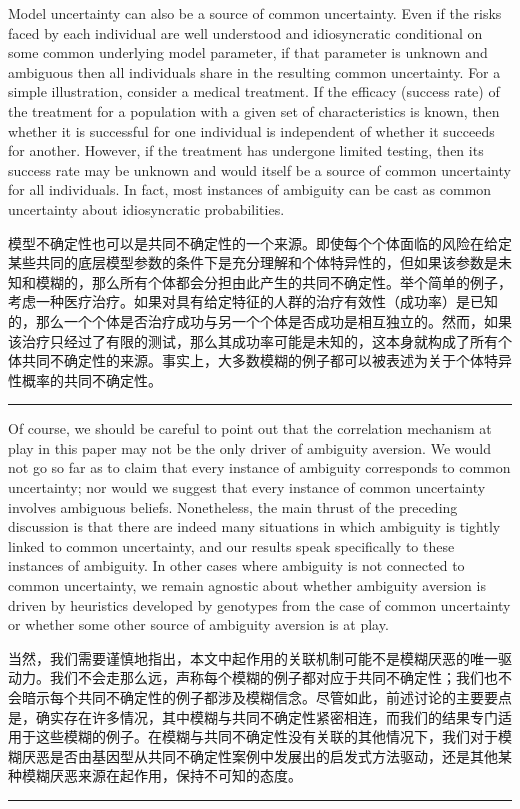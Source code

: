 \documentclass[12pt,a4paper]{article}
\newenvironment{original}
  {\par\noindent\color{black}\smallskip}
  {\par\smallskip}
\newenvironment{translation}
  {\par\noindent\color{blue!70!black}\smallskip}
  {\par\medskip\hrule\medskip}
\begin{document}
\begin{original}
Model uncertainty can also be a source of common uncertainty. Even if the risks faced by each individual are well understood and idiosyncratic conditional on some common underlying model parameter, if that parameter is unknown and ambiguous then all individuals share in the resulting common uncertainty. For a simple illustration, consider a medical treatment. If the efficacy (success rate) of the treatment for a population with a given set of characteristics is known, then whether it is successful for one individual is independent of whether it succeeds for another. However, if the treatment has undergone limited testing, then its success rate may be unknown and would itself be a source of common uncertainty for all individuals. In fact, most instances of ambiguity can be cast as common uncertainty about idiosyncratic probabilities.
\end{original}
\begin{translation}
模型不确定性也可以是共同不确定性的一个来源。即使每个个体面临的风险在给定某些共同的底层模型参数的条件下是充分理解和个体特异性的，但如果该参数是未知和模糊的，那么所有个体都会分担由此产生的共同不确定性。举个简单的例子，考虑一种医疗治疗。如果对具有给定特征的人群的治疗有效性（成功率）是已知的，那么一个个体是否治疗成功与另一个个体是否成功是相互独立的。然而，如果该治疗只经过了有限的测试，那么其成功率可能是未知的，这本身就构成了所有个体共同不确定性的来源。事实上，大多数模糊的例子都可以被表述为关于个体特异性概率的共同不确定性。
\end{translation}

\begin{original}
Of course, we should be careful to point out that the correlation mechanism at play in this paper may not be the only driver of ambiguity aversion. We would not go so far as to claim that every instance of ambiguity corresponds to common uncertainty; nor would we suggest that every instance of common uncertainty involves ambiguous beliefs. Nonetheless, the main thrust of the preceding discussion is that there are indeed many situations in which ambiguity is tightly linked to common uncertainty, and our results speak specifically to these instances of ambiguity. In other cases where ambiguity is not connected to common uncertainty, we remain agnostic about whether ambiguity aversion is driven by heuristics developed by genotypes from the case of common uncertainty or whether some other source of ambiguity aversion is at play.
\end{original}
\begin{translation}
当然，我们需要谨慎地指出，本文中起作用的关联机制可能不是模糊厌恶的唯一驱动力。我们不会走那么远，声称每个模糊的例子都对应于共同不确定性；我们也不会暗示每个共同不确定性的例子都涉及模糊信念。尽管如此，前述讨论的主要要点是，确实存在许多情况，其中模糊与共同不确定性紧密相连，而我们的结果专门适用于这些模糊的例子。在模糊与共同不确定性没有关联的其他情况下，我们对于模糊厌恶是否由基因型从共同不确定性案例中发展出的启发式方法驱动，还是其他某种模糊厌恶来源在起作用，保持不可知的态度。
\end{translation}
\end{document}
